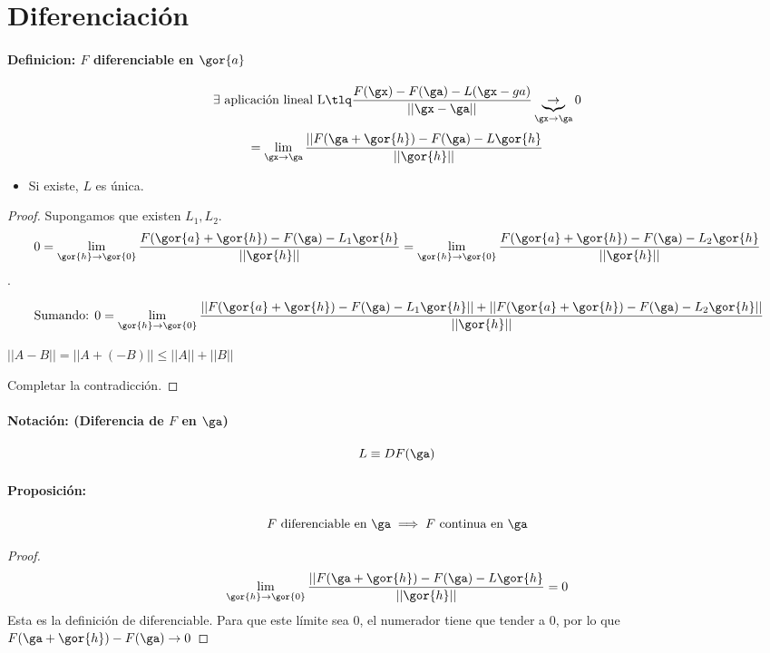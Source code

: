 \documentclass[a4paper,10pt]{apuntes}
\newcommand{\definition}[1]{\paragraph{Definicion: #1\\}}
\begin{document}
\section{Diferenciación}
\definition{$F$ diferenciable en $\gor{a}$}
$$\exists \text{ aplicación lineal L} \tlq \frac{F(\gx)-F(\ga)-L(\gx-ga)}{||\gx-\ga||} \underbrace{\rightarrow}_{\gx\rightarrow\ga} 0$$
$$ = \lim_{\gx \rightarrow \ga} \frac{||F(\ga+\gor{h}) - F(\ga) - L\gor{h}}{||\gor{h}||}$$
\obs
\begin{itemize}
\item Si existe, $L$ es única.
\end{itemize}

\begin{proof}
Supongamos que existen $L_1,L_2$.
\[0=\lim_{\gor{h} \rightarrow \gor{0}} \frac{F(\gor{a}+\gor{h}) - F(\ga)-L_1\gor{h}}{||\gor{h}||} = \lim_{\gor{h} \rightarrow \gor{0}} \frac{F(\gor{a}+\gor{h}) - F(\ga)-L_2\gor{h}}{||\gor{h}||}\].

$$\text{ Sumando: } 0 = \lim_{\gor{h} \rightarrow \gor{0}} \frac{||F(\gor{a}+\gor{h}) - F(\ga)-L_1\gor{h}|| + ||F(\gor{a}+\gor{h}) - F(\ga) -L_2\gor{h}||}{||\gor{h}||}$$

\obs $||A-B|| = ||A+(-B)|| \leq ||A||+||B||$

Completar la contradicción.

\end{proof}

\paragraph{Notación: (Diferencia de $F$ en $\ga$)}

$$L\equiv DF(\ga)$$ 

\paragraph{Proposición:}
$$F \text{ diferenciable en } \ga \implies F \text{ continua en } \ga$$
\begin{proof}
 $$\lim_{\gor{h} \rightarrow \gor{0}} \frac{||F(\ga+\gor{h}) - F(\ga) - L\gor{h}}{||\gor{h}||} = 0$$
 Esta es la definición de diferenciable. Para que este límite sea 0, el numerador tiene que tender a 0, por lo que $F(\ga+\gor{h}) - F(\ga) \rightarrow 0$
\end{proof}
\end{document}
